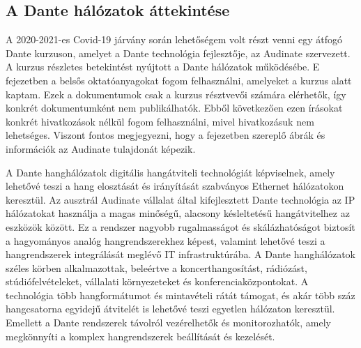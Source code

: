 \subsection{A Dante hálózatok áttekintése}

A 2020-2021-es Covid-19 járvány során lehetőségem volt részt venni egy átfogó Dante
kurzuson, amelyet a Dante technológia fejlesztője, az Audinate szervezett. A kurzus
részletes betekintést nyújtott a Dante hálózatok működésébe. E fejezetben a belsős
oktatóanyagokat fogom felhasználni, amelyeket a kurzus alatt kaptam. Ezek a dokumentumok
csak a kurzus résztvevői számára elérhetők, így konkrét dokumentumként nem publikálhatók. 
Ebből következően ezen írásokat konkrét hivatkozások nélkül fogom felhasználni, mivel
hivatkozásuk nem lehetséges.
Viszont fontos megjegyezni, hogy a fejezetben szereplő ábrák és információk az Audinate tulajdonát képezik.

A Dante hanghálózatok digitális hangátviteli technológiát képviselnek, amely lehetővé teszi
a hang elosztását és irányítását szabványos Ethernet hálózatokon keresztül. Az ausztrál
Audinate vállalat által kifejlesztett Dante technológia az IP hálózatokat használja a
magas minőségű, alacsony késleltetésű hangátvitelhez az eszközök között. Ez a rendszer
nagyobb rugalmasságot és skálázhatóságot biztosít a hagyományos analóg hangrendszerekhez
képest, valamint lehetővé teszi a hangrendszerek integrálását meglévő IT infrastruktúrába.
A Dante hanghálózatok széles körben alkalmazottak, beleértve a koncerthangosítást, rádiózást,
stúdiófelvételeket, vállalati környezeteket és konferenciaközpontokat. A technológia
több hangformátumot és mintavételi rátát támogat, és akár több száz hangcsatorna egyidejű
átvitelét is lehetővé teszi egyetlen hálózaton keresztül. Emellett a Dante rendszerek távolról
vezérelhetők és monitorozhatók, amely megkönnyíti a komplex hangrendszerek beállítását és
kezelését.


